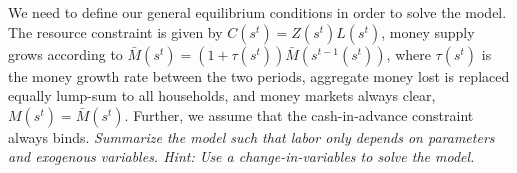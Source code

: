 \documentclass[a4paper, 12pt]{article}
\begin{document}
\bigskip%
\begin{Exercise}[title={General equilibrium in the stochastic model},label=ex_2]%
	We need to define our general equilibrium conditions in order to solve the model. The resource constraint is given by $C(s^t) = Z(s^t) L(s^t)$, money supply grows according to $\bar{M}(s^t) = (1+\tau (s^t)) \bar{M}(s^{t-1}(s^t))$, where $\tau (s^t)$ is the money growth rate between the two periods, aggregate money lost is replaced equally lump-sum to all households, and money markets always clear, $M(s^t) = \bar{M}(s^t)$. Further, we assume that the cash-in-advance constraint always binds. \emph{Summarize the model such that labor only depends on parameters and exogenous variables. Hint: Use a change-in-variables to solve the model.}%
\end{Exercise}%
\bigskip%
\end{document}
